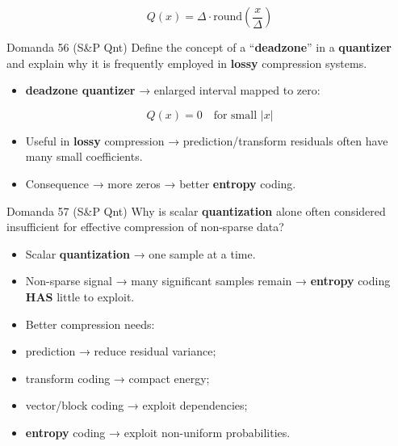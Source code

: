 $$
Q(x)=\Delta\cdot\text{round}\left(\frac{x}{\Delta}\right)
$$


\begin{tcolorbox}[colback=white, colframe=gray!50, height=4.5cm, sharp corners]
\end{tcolorbox}
\begin{tcolorbox}[colback=white, colframe=gray!50, height=4.5cm, sharp corners]
\end{tcolorbox}



\begin{questionbox}{Domanda 56}
(S\&P Qnt) Define the concept of a “\textbf{deadzone}” in a \textbf{quantizer} and explain why it is frequently employed in \textbf{lossy} compression systems.
\end{questionbox}


\begin{itemize}
  \item \textbf{\textbf{deadzone} \textbf{quantizer}} → enlarged interval mapped to zero:
\end{itemize}


$$
Q(x)=0 \quad \text{for small } |x|
$$


\begin{itemize}
  \item Useful in \textbf{lossy} compression → prediction/transform residuals often have many small coefficients.
  \item Consequence → more zeros → better \textbf{entropy} coding.
\end{itemize}

\begin{tcolorbox}[colback=white, colframe=gray!50, height=4.5cm, sharp corners]
\end{tcolorbox}



\begin{questionbox}{Domanda 57}
(S\&P Qnt) Why is scalar \textbf{quantization} alone often considered insufficient for effective compression of non-sparse data?
\end{questionbox}


\begin{itemize}
  \item Scalar \textbf{quantization} → one sample at a time.
  \item Non-sparse signal → many significant samples remain → \textbf{entropy} coding \textbf{HAS} little to exploit.
  \item Better compression needs:
  \item prediction → reduce residual variance;
  \item transform coding → compact energy;
  \item vector/block coding → exploit dependencies;
  \item \textbf{entropy} coding → exploit non-uniform probabilities.
\end{itemize}



